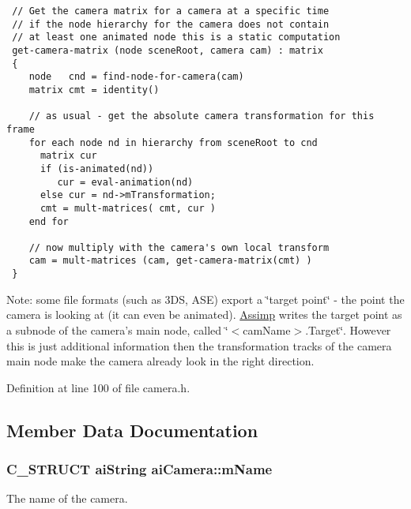 \begin{Code}\begin{verbatim} // Get the camera matrix for a camera at a specific time
 // if the node hierarchy for the camera does not contain
 // at least one animated node this is a static computation
 get-camera-matrix (node sceneRoot, camera cam) : matrix
 {
    node   cnd = find-node-for-camera(cam)
    matrix cmt = identity()

    // as usual - get the absolute camera transformation for this frame
    for each node nd in hierarchy from sceneRoot to cnd
      matrix cur
      if (is-animated(nd))
         cur = eval-animation(nd)
      else cur = nd->mTransformation;
      cmt = mult-matrices( cmt, cur )
    end for

    // now multiply with the camera's own local transform
    cam = mult-matrices (cam, get-camera-matrix(cmt) )
 }
\end{verbatim}
\end{Code}



\begin{Desc}
\item[Note:]some file formats (such as 3DS, ASE) export a \char`\"{}target point\char`\"{} - the point the camera is looking at (it can even be animated). \hyperlink{namespace_assimp}{Assimp} writes the target point as a subnode of the camera's main node, called \char`\"{}$<$camName$>$.Target\char`\"{}. However this is just additional information then the transformation tracks of the camera main node make the camera already look in the right direction. \end{Desc}


Definition at line 100 of file camera.h.

\subsection{Member Data Documentation}
\hypertarget{structai_camera_a6a5fe5e04b3db1b23f69eb9910c6816}{
\subsubsection[mName]{\setlength{\rightskip}{0pt plus 5cm}C\_\-STRUCT {\bf aiString} {\bf aiCamera::mName}}}
\label{structai_camera_a6a5fe5e04b3db1b23f69eb9910c6816}


The name of the camera.

